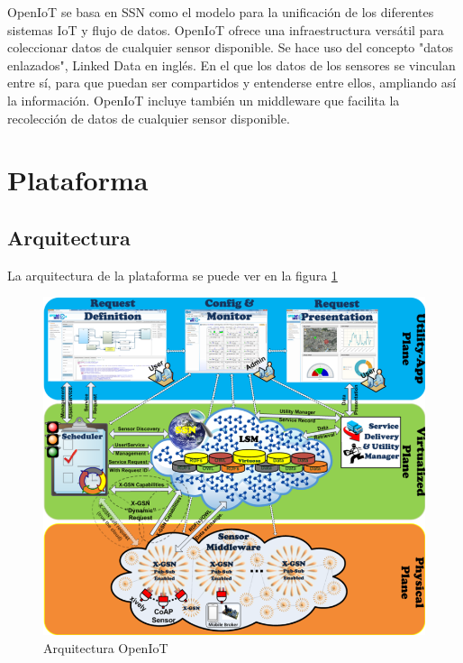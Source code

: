 \documentclass[12pt, twoside]{book}
\begin{document}
OpenIoT se basa en SSN como el modelo para la unificación de los diferentes sistemas IoT y flujo de datos. OpenIoT ofrece una infraestructura versátil para coleccionar datos de cualquier sensor disponible. Se hace uso del concepto "datos enlazados", Linked Data en inglés. En el que los datos de los sensores se vinculan entre sí, para que puedan ser compartidos y entenderse entre ellos, ampliando así la información. OpenIoT incluye también un middleware que facilita la recolección de datos de cualquier sensor disponible.
\section{Plataforma}
\subsection{Arquitectura}
La arquitectura de la plataforma se puede ver en la figura \ref{L400} 
\begin{figure}[H]
\centering
\includegraphics[scale=0.4]{images/openiot_platform1}
\caption{Arquitectura OpenIoT}\label{L400}
\end{figure}
\end{document}
